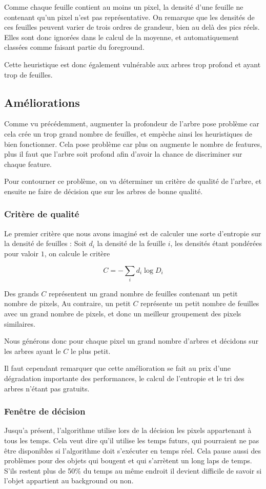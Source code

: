 \documentclass[11pt,a4paper]{report}
\begin{document}
			Comme chaque feuille contient au moins un pixel, la densité d'une feuille ne contenant qu'un pixel n'est pas
			représentative. On remarque que les densités de ces feuilles peuvent varier de trois ordres de grandeur, bien
			au delà des pics réels. Elles sont donc ignorées dans le calcul de la moyenne, et automatiquement classées
			comme faisant partie du foreground. 

			Cette heuristique est donc également vulnérable aux arbres trop profond et ayant trop de feuilles. 

	\subsection{Améliorations}
		Comme vu précédemment, augmenter la profondeur de l'arbre pose problème car cela crée un trop grand nombre de feuilles, 
		et empèche ainsi les heuristiques de bien fonctionner. Cela pose problème car plus on augmente le nombre de features,
		plus il faut que l'arbre soit profond afin d'avoir la chance de discriminer sur chaque feature. 

		Pour contourner ce problème, on va déterminer un critère de qualité de l'arbre, et ensuite ne faire de décision que sur
		les arbres de bonne qualité. 
		\subsubsection{Critère de qualité}
			Le premier critère que nous avons imaginé est de calculer une sorte d'entropie sur la densité de feuilles : 
			Soit $d_{i}$ la densité de la feuille $i$, les densités étant pondérées pour valoir $1$, on calcule le critère 
			
			\[ C = -\sum_{i} d_{i}\log{D_{i}} \]

			Des grands $C$ représentent un grand nombre de feuilles contenant un petit nombre de pixels, Au contraire, un petit $C$
			représente un petit nombre de feuilles avec un grand nombre de pixels, et donc un meilleur groupement des pixels
			similaires. 

			Nous générons donc pour chaque pixel un grand nombre d'arbres et décidons sur les arbres ayant le $C$ le plus petit.

			Il faut cependant remarquer que cette amélioration se fait au prix d'une dégradation importante des performances,
			le calcul de l'entropie et le tri des arbres n'étant pas gratuits.
		\subsubsection{Fenêtre de décision}
			Jusqu'a présent, l'algorithme utilise lors de la décision les pixels appartenant à tous les temps. Cela veut dire qu'il
			utilise les temps futurs, qui pourraient ne pas être disponibles si l'algorithme doit s'exécuter en temps réel. Cela
			pause aussi des problèmes pour des objets qui bougent et qui s'arrètent un long laps de temps. S'ils restent plus
			de 50\% du temps au même endroit il devient difficile de savoir si l'objet appartient au background ou non.
\end{document}
